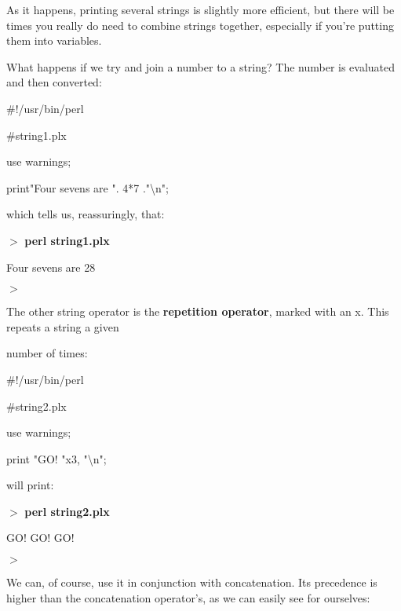 \documentclass[a4paper,11pt]{book}
\begin{document}
\noindent 

\noindent As it happens, printing several strings is slightly more efficient, but there will be times you really do need to combine strings together, especially if you're putting them into variables.

\noindent 

\noindent What happens if we try and join a number to a string? The number is evaluated and then converted:

\noindent 

\noindent 

\noindent \#!/usr/bin/perl

\noindent \#string1.plx

\noindent use warnings;

\noindent print"Four sevens are ". 4*7 ."\textbackslash n";

\noindent 

\noindent which tells us, reassuringly, that:

\noindent 

\noindent $>$  \textbf{perl string1.plx}

\noindent Four sevens are 28

\noindent $>$

\noindent 

\noindent 

\noindent The other string operator is the \textbf{repetition operator}, marked with an x. This repeats a string a given

\noindent number of times:

\noindent 

\noindent \#!/usr/bin/perl

\noindent \#string2.plx

\noindent use warnings;

\noindent print "GO! "x3, "\textbackslash n";

\noindent 

\noindent will print:

\noindent 

\noindent $>$ \textbf{perl string2.plx}

\noindent GO! GO! GO!

\noindent $>$

\noindent 

\noindent We can, of course, use it in conjunction with concatenation. Its precedence is higher than the concatenation operator's, as we can easily see for ourselves:

\noindent 
\end{document}
